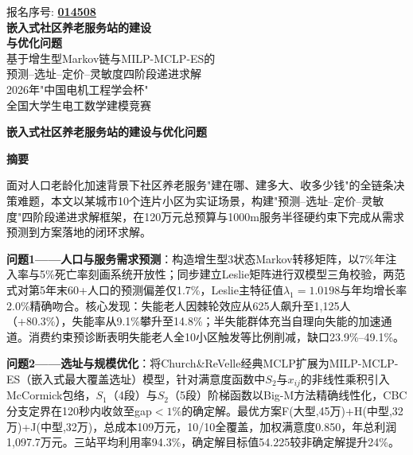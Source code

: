 \documentclass[12pt,a4paper]{ctexart}
\renewcommand{\headrulewidth}{0pt}
\begin{document}
\begin{titlepage}
\thispagestyle{empty}
\begin{center}
\vspace*{0.5cm}
{\Large 报名序号: \textbf{\underline{014508}}}\\[2.5cm]
{\Huge \textbf{嵌入式社区养老服务站的建设}}\\[0.5cm]
{\Huge \textbf{与优化问题}}\\[1.5cm]
{\Large 基于增生型Markov链与MILP-MCLP-ES的}\\[0.3cm]
{\Large 预测--选址--定价--灵敏度四阶段递进求解}\\[2cm]
{\Large 2026年"中国电机工程学会杯"}\\[0.3cm]
{\Large 全国大学生电工数学建模竞赛}\\[3cm]
\end{center}
\end{titlepage}

\setcounter{page}{1}
\pagestyle{fancy}
\fancyhf{}
\fancyfoot[C]{\thepage}
\renewcommand{\headrulewidth}{0pt}

\begin{center}
{\Large \textbf{嵌入式社区养老服务站的建设与优化问题}}
\end{center}
\vspace{0.2cm}

\begin{center}
{\Large \textbf{摘\quad 要}}
\end{center}
\vspace{0.2cm}

面对人口老龄化加速背景下社区养老服务"建在哪、建多大、收多少钱"的全链条决策难题，本文以某城市10个连片小区为实证场景，构建"预测--选址--定价--灵敏度"四阶段递进求解框架，在120万元总预算与1000m服务半径硬约束下完成从需求预测到方案落地的闭环求解。

\textbf{问题1——人口与服务需求预测}：构造增生型3状态Markov转移矩阵，以7\%年注入率与5\%死亡率刻画系统开放性；同步建立Leslie矩阵进行双模型三角校验，两范式对第5年末60+人口的预测偏差仅1.7\%，Leslie主特征值$\lambda_1=1.0198$与年均增长率2.0\%精确吻合。核心发现：失能老人因棘轮效应从625人飙升至1,125人（+80.3\%），失能率从9.1\%攀升至14.8\%；半失能群体充当自理向失能的加速通道。消费约束预诊断表明失能老人全10小区触发等比例削减，缺口23.9\%--49.1\%。

\textbf{问题2——选址与规模优化}：将Church\&ReVelle经典MCLP扩展为MILP-MCLP-ES（嵌入式最大覆盖选址）模型，针对满意度函数中$S_2$与$x_{ij}$的非线性乘积引入McCormick包络，$S_1$（4段）与$S_2$（5段）阶梯函数以Big-M方法精确线性化，CBC分支定界在120秒内收敛至gap$<1\%$的确定解。最优方案F(大型,45万)+H(中型,32万)+J(中型,32万)，总成本109万元，10/10全覆盖，加权满意度0.850，年总利润1,097.7万元。三站平均利用率94.3\%，确定解目标值54.225较非确定解提升24\%。
\end{document}
